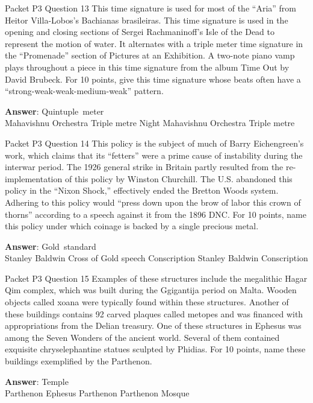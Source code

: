 \begin{frame}{Packet P3 Question 13}
This time signature is     used for most of the   ``Aria'' from Heitor Villa-Lobos's Bachianas brasileiras. This time signature is used in the opening and closing sections of Sergei Rachmaninoff's Isle of the Dead to represent the motion of water. It alternates with a triple meter time signature in the ``Promenade'' section of Pictures at an Exhibition. A two-note piano vamp plays throughout a piece in this time signature from the album Time Out by David Brubeck. For 10 points, give this time signature whose beats often have a ``strong-weak-weak-medium-weak'' pattern.      

\textbf{Answer}: Quintuple\ meter\\
 Mahavishnu Orchestra
 Triple metre
 Night
 Mahavishnu Orchestra
 Triple metre
\end{frame}

\begin{frame}{Packet P3 Question 14}
This policy is the subject of much of Barry Eichengreen's work, which claims that its ``fetters'' were a prime cause of instability during the interwar period. The   1926 general strike in Britain partly resulted from the re-implementation of this policy by Winston Churchill. The U.S. abandoned this policy in the ``Nixon Shock,'' effectively ended the Bretton Woods system. Adhering to this policy would ``press down upon the brow of labor this crown of thorns'' according to a speech against it from the 1896 DNC. For 10 points, name this policy under which coinage is backed by a single precious metal.        

\textbf{Answer}: Gold\ standard\\
 Stanley Baldwin
 Cross of Gold speech
 Conscription
 Stanley Baldwin
 Conscription
\end{frame}

\begin{frame}{Packet P3 Question 15}
Examples of these structures include the megalithic Hagar Qim complex, which was built during the Ggigantija period on Malta. Wooden objects called xoana were typically found within these structures. Another of these buildings contains 92 carved plaques called metopes and was financed with appropriations from the Delian treasury. One of these structures in Ephesus was among the Seven Wonders of the ancient world. Several of them contained exquisite chryselephantine statues sculpted by Phidias. For   10 points, name these buildings exemplified by the Parthenon.        

\textbf{Answer}: Temple\\
 Parthenon
 Ephesus
 Parthenon
 Parthenon
 Mosque
\end{frame}

